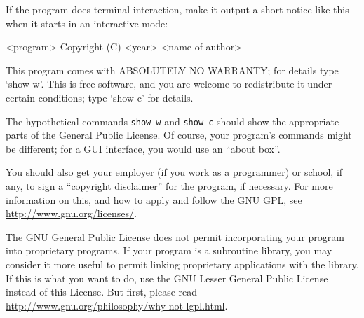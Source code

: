 \begin{enumerate}
If the program does terminal interaction, make it output a short
notice like this when it starts in an interactive mode:

{\footnotesize\ttfamily
<program>  Copyright (C) <year>  <name of author>

This program comes with ABSOLUTELY NO WARRANTY; for details type `show w'.
This is free software, and you are welcome to redistribute it
under certain conditions; type `show c' for details.
}

The hypothetical commands {\tt show w} and {\tt show c} should show
the appropriate
parts of the General Public License.  Of course, your program's commands
might be different; for a GUI interface, you would use an ``about box''.

You should also get your employer (if you work as a programmer) or
school, if any, to sign a ``copyright disclaimer'' for the program, if
necessary.  For more information on this, and how to apply and follow
the GNU GPL, see \url{http://www.gnu.org/licenses/}.

The GNU General Public License does not permit incorporating your
program into proprietary programs.  If your program is a subroutine
library, you may consider it more useful to permit linking proprietary
applications with the library.  If this is what you want to do, use
the GNU Lesser General Public License instead of this License.  But
first, please read \url{http://www.gnu.org/philosophy/why-not-lgpl.html}.

\end{enumerate}




